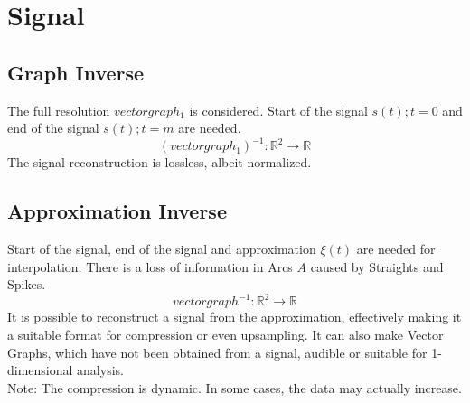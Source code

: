 \documentclass{report}
\begin{document}
\chapter{Signal}
\section{Graph Inverse}
The full resolution $vectorgraph_{1}$ is considered. Start of the signal $s(t);t=0$ and end of the signal $s(t);t=m$ are needed.
\begin{equation}
(vectorgraph_{1})^{-1}: \mathbb{R}^2 \rightarrow \mathbb{R}
\end{equation}
The signal reconstruction is lossless, albeit normalized.
\section{Approximation Inverse}
Start of the signal, end of the signal and approximation $\xi(t)$ are needed for interpolation. There is a loss of information in Arcs $A$ caused by Straights and Spikes.
\begin{equation}
vectorgraph^{-1}: \mathbb{R}^2 \rightarrow \mathbb{R}
\end{equation}
It is possible to reconstruct a signal from the approximation, effectively making it a suitable format for compression or even upsampling. It can also make Vector Graphs, which have not been obtained from a signal, audible or suitable for 1-dimensional analysis.\\
Note: The compression is dynamic. In some cases, the data may actually increase.
\end{document}
